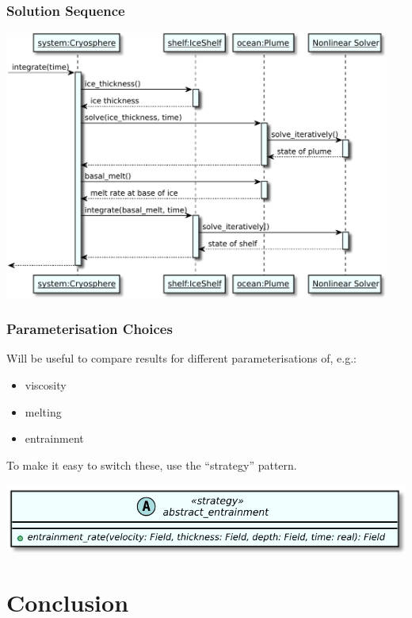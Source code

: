 \documentclass[12pt]{beamer}
\begin{document}
\begin{frame}
  \frametitle{Solution Sequence}
  \begin{center}
    \includegraphics[width=0.95\textwidth]{isoft_sequence.pdf}
  \end{center}
\end{frame}

\begin{frame}
  \frametitle{Parameterisation Choices}
  Will be useful to compare results for different parameterisations
  of, e.g.:
  \begin{itemize}
  \item viscosity
  \item melting
  \item entrainment
  \end{itemize}
  
  To make it easy to switch these, use the ``strategy'' pattern.
  \begin{center}
    \includegraphics[width=\textwidth]{parameterisations.pdf}
  \end{center}
\end{frame}


\section{Conclusion}
\end{document}

